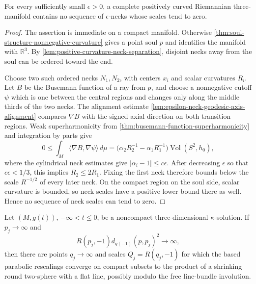 \begin{proposition}
\label{prop:positive-curvature-neck-scale-lower-bound}
\notready
For every sufficiently small $\epsilon>0$, a complete positively curved
Riemannian three-manifold contains no sequence of $\epsilon$-necks whose
scales tend to zero.
\end{proposition}

\begin{proof}
The assertion is immediate on a compact manifold.  Otherwise
\ref{thm:soul-structure-nonnegative-curvature} gives a point soul $p$ and
identifies the manifold with $\mathbb R^3$.  By
\ref{lem:positive-curvature-neck-separation}, disjoint necks away from the
soul can be ordered toward the end.

Choose two such ordered necks $N_1,N_2$, with centers $x_i$ and scalar
curvatures $R_i$.  Let $B$ be the Busemann function of a ray from $p$, and
choose a nonnegative cutoff $\psi$ which is one between the central regions
and changes only along the middle thirds of the two necks.  The alignment
estimate \ref{lem:epsilon-neck-geodesic-axis-alignment} compares $\nabla B$
with the signed axial direction on both transition regions.  Weak
superharmonicity from \ref{thm:busemann-function-superharmonicity} and
integration by parts give
\[
 0\le \int_M\langle\nabla B,\nabla\psi\rangle\,d\mu
   =\bigl(\alpha_2R_2^{-1}-\alpha_1R_1^{-1}\bigr)
      \operatorname{Vol}(S^2,h_0),
\]
where the cylindrical neck estimates give
$|\alpha_i-1|\le c\epsilon$.  After decreasing $\epsilon$ so that
$c\epsilon<1/3$, this implies $R_2\le2R_1$.  Fixing the first neck therefore
bounds below the scale $R^{-1/2}$ of every later neck.  On the compact region
on the soul side, scalar curvature is bounded, so neck scales have a positive
lower bound there as well.  Hence no sequence of neck scales can tend to
zero.
\end{proof}

\begin{theorem}
\label{thm:kappa-solution-splitting-at-infinity}
\notready
Let $(M,g(t))$, $-\infty<t\le0$, be a noncompact three-dimensional
$\kappa$-solution.  If $p_j\to\infty$ and
\[
 R(p_j,-1)d_{g(-1)}(p,p_j)^2\longrightarrow\infty,
\]
then there are points $q_j\to\infty$ and scales $Q_j=R(q_j,-1)$ for
which the based parabolic rescalings converge on compact subsets to the
product of a shrinking round two-sphere with a flat line, possibly modulo
the free line-bundle involution.
\end{theorem}

